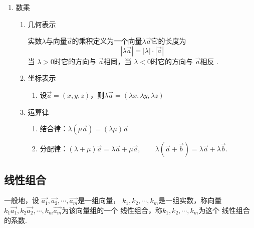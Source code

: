 \begin{enumerate}
\begin{enumerate}[(1)]
\begin{enumerate}
\begin{minipage}{0.4\linewidth}
			\end{minipage}
		\end{enumerate}
	\end{enumerate}
\newpage
	\item {\color{dy}数乘}
	\begin{enumerate}[(1)]
		\setlength{\topsep}{0.01em}
		\setlength{\itemsep}{0.01em}
		\item{\color{dy2}几何表示}
		\begin{enumerate}
			实数$\lambda$与向量$\overrightarrow a$的乘积定义为一个向量$\lambda \overrightarrow{a}$它的长度为
			\begin{equation}
				\left| \lambda \overrightarrow{a}\right| =|\lambda |\cdot \left| \overrightarrow{a}\right|
			\end{equation} 
			当 $\lambda >0$时它的方向与 $\overrightarrow{a}$相同，当 $\lambda <0$时它的方向与 $\overrightarrow{a}$相反 .
		\end{enumerate}
		\item {\color{dy2}坐标表示}
		\begin{enumerate}[]
					\setlength{\itemindent}{1em} 
			\setlength{\topsep}{0.01em}
			\setlength{\itemsep}{0.01em}
			\item 设$\overrightarrow a = (x,y,z)$，则$\lambda\overrightarrow{a}=(\lambda x,\lambda y,\lambda z)$
		\end{enumerate}
		\item{\color{dy2} 运算律}
		\begin{enumerate}
					\setlength{\itemindent}{1em} 
			\setlength{\topsep}{0.01em}
			\setlength{\itemsep}{0.01em}
			\item 结合律：$\lambda (\mu \overrightarrow{a})=(\lambda \mu )\overrightarrow{a}$
			\item 分配律：$(\lambda + \mu )\overrightarrow{a}=\lambda \overrightarrow{a}+\mu \overrightarrow{a} , \qquad \lambda(\overrightarrow{a}+\overrightarrow{b})=\lambda \overrightarrow{a}+\lambda \overrightarrow{b}.$
		\end{enumerate}
	\end{enumerate}
\end{enumerate}
\subsection{线性组合}
\tdefination[线性组合]
一般地，设 $\overrightarrow {a_1},\overrightarrow {a_2},\cdots ,\overrightarrow {a_m}$是一组向量， $k_1,k_2,\cdots ,k_m$是一组实数，称向量 $k_1\overrightarrow{ a_1},k_2\overrightarrow {a_2},\cdots ,k_m\overrightarrow{ a_m}$为该向量组的一个 {\color{dy}线性组合}，称$k_1,k_2,\cdots ,k_m$为这个 {\color{dy}线性组合的系数}. 


